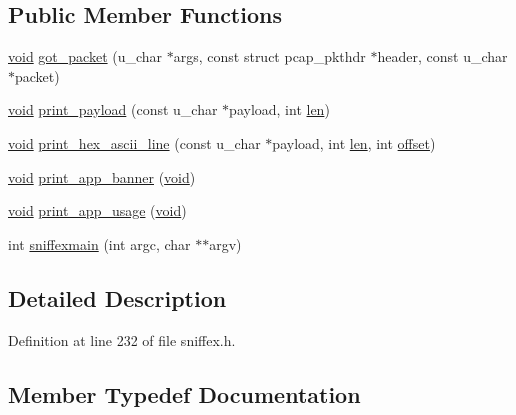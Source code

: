 \subsection*{Public Member Functions}
\begin{DoxyCompactItemize}
\item 
\mbox{\hyperlink{glad_8h_a950fc91edb4504f62f1c577bf4727c29}{void}} \mbox{\hyperlink{class_sniffex_a3d4ef3c90e55035eadca2d577004cd14}{got\+\_\+packet}} (u\+\_\+char $\ast$args, const struct pcap\+\_\+pkthdr $\ast$header, const u\+\_\+char $\ast$packet)
\item 
\mbox{\hyperlink{glad_8h_a950fc91edb4504f62f1c577bf4727c29}{void}} \mbox{\hyperlink{class_sniffex_a1b24163d441d38f3672800c3de85d149}{print\+\_\+payload}} (const u\+\_\+char $\ast$payload, int \mbox{\hyperlink{glad_8h_a652168017ea9a8bbcead03d5c16269fb}{len}})
\item 
\mbox{\hyperlink{glad_8h_a950fc91edb4504f62f1c577bf4727c29}{void}} \mbox{\hyperlink{class_sniffex_aec1e34cb4b2ff906304f957c205707ea}{print\+\_\+hex\+\_\+ascii\+\_\+line}} (const u\+\_\+char $\ast$payload, int \mbox{\hyperlink{glad_8h_a652168017ea9a8bbcead03d5c16269fb}{len}}, int \mbox{\hyperlink{glad_8h_ac915cd848f42b26af51745f204a3b9af}{offset}})
\item 
\mbox{\hyperlink{glad_8h_a950fc91edb4504f62f1c577bf4727c29}{void}} \mbox{\hyperlink{class_sniffex_ab32951f576e7cd62caf4fe1c5b085b4e}{print\+\_\+app\+\_\+banner}} (\mbox{\hyperlink{glad_8h_a950fc91edb4504f62f1c577bf4727c29}{void}})
\item 
\mbox{\hyperlink{glad_8h_a950fc91edb4504f62f1c577bf4727c29}{void}} \mbox{\hyperlink{class_sniffex_aea81794fe2ac6e2b857eef01c3b109e5}{print\+\_\+app\+\_\+usage}} (\mbox{\hyperlink{glad_8h_a950fc91edb4504f62f1c577bf4727c29}{void}})
\item 
int \mbox{\hyperlink{class_sniffex_a41e146d588c285c94c0beee223d8552b}{sniffexmain}} (int argc, char $\ast$$\ast$argv)
\end{DoxyCompactItemize}


\subsection{Detailed Description}


Definition at line 232 of file sniffex.\+h.



\subsection{Member Typedef Documentation}
\mbox{\label{class_sniffex_a83629f6a3ec687dd2bb381e9bf157d4f}} 
